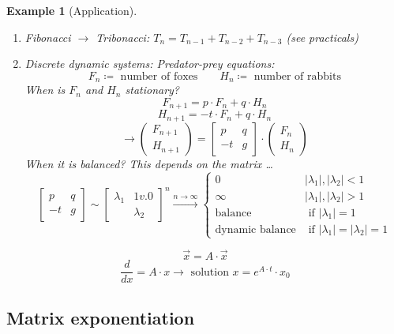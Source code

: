 \documentclass{article}
\newtheorem{example}{Example}  \numberwithin{example}{section}
\newcommand{\card}[1]{\left|#1\right|}
\begin{document}
\begin{example}[Application]
  \begin{enumerate}
    \item Fibonacci $\to$ Tribonacci: $T_n = T_{n-1} + T_{n-2} + T_{n-3}$ (see practicals)
    \item Discrete dynamic systems: Predator-prey equations:
      \[ F_n \coloneqq \text{ number of foxes} \qquad H_n \coloneqq \text{ number of rabbits} \]
      When is $F_n$ and $H_n$ stationary?
      \[ F_{n+1} = p \cdot F_n + q \cdot H_n \]
      \[ H_{n+1} = -t \cdot F_n + q \cdot H_n \]
      \[ \to \begin{pmatrix} F_{n+1} \\ H_{n+1} \end{pmatrix} = \begin{bmatrix} p & q \\ -t & g \end{bmatrix} \cdot \begin{pmatrix} F_n \\ H_n \end{pmatrix} \]
      When it is balanced? This depends on the matrix \dots
      \[
        \begin{bmatrix} p & q \\ -t & g \end{bmatrix} \sim \begin{bmatrix} \lambda_1 & 1v.0 \\ & \lambda_2 \end{bmatrix}^n %
        \xrightarrow{n \to \infty} \begin{cases}
          0 & \card{\lambda_1}, \card{\lambda_2} < 1 \\
          \infty & \card{\lambda_1}, \card{\lambda_2} > 1 \\
          \text{balance} & \text{ if } \card{\lambda_1} = 1 \\
          \text{dynamic balance} & \text{ if } \card{\lambda_1} = \card{\lambda_2} = 1
        \end{cases}
      \]
  \end{enumerate}
  \[ \vec x = A \cdot \vec x \]
  \[ \frac{d}{dx} = A \cdot x \rightarrow \text{ solution } x = e^{A \cdot t} \cdot x_0 \]
\end{example}

\subsection{Matrix exponentiation}
\end{document}
